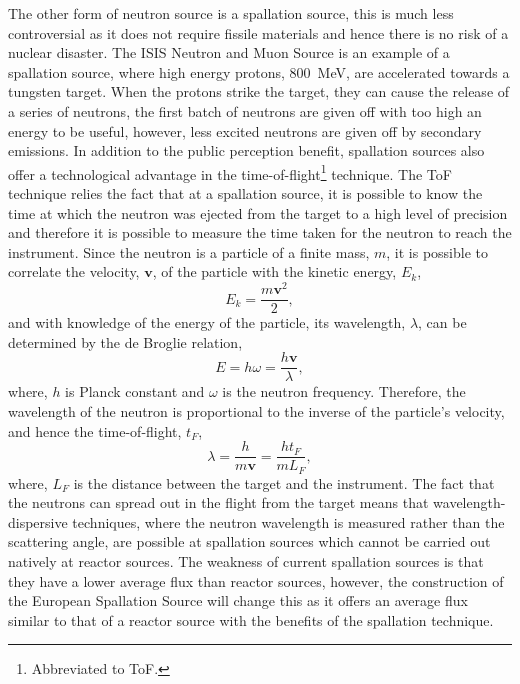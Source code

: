 The other form of neutron source is a spallation source, this is much less controversial as it does not require fissile materials and hence there is no risk of a nuclear disaster.
The ISIS Neutron and Muon Source is an example of a spallation source, where high energy protons, \SI{800}{\mega\eV},\autocite{noauthor_isis_nodate-1} are accelerated towards a tungsten target.
When the protons strike the target, they can cause the release of a series of neutrons, the first batch of neutrons are given off with too high an energy to be useful, however, less excited neutrons are given off by secondary emissions.
In addition to the public perception benefit, spallation sources also offer a technological advantage in the time-of-flight\footnote{Abbreviated to ToF.} technique.
The ToF technique relies the fact that at a spallation source, it is possible to know the time at which the neutron was ejected from the target to a high level of precision and therefore it is possible to measure the time taken for the neutron to reach the instrument.
Since the neutron is a particle of a finite mass, $m$, it is possible to correlate the velocity, $\mathbf{v}$, of the particle with the kinetic energy, $E_k$,
%
\begin{equation}
    E_k = \frac{m\mathbf{v}^2}{2},
\end{equation}
%
and with knowledge of the energy of the particle, its wavelength, $\lambda$, can be determined by the de Broglie relation,\autocite{de_broglie_recherches_1925}
%
\begin{equation}
    E = h\omega = \frac{h\mathbf{v}}{\lambda},
\end{equation}
%
where, $h$ is Planck constant and $\omega$ is the neutron frequency.
Therefore, the wavelength of the neutron is proportional to the inverse of the particle's velocity, and hence the time-of-flight, $t_F$,
%
\begin{equation}
    \lambda = \frac{h}{m\mathbf{v}} = \frac{ht_F}{mL_F},
\end{equation}
%
where, $L_F$ is the distance between the target and the instrument.
The fact that the neutrons can spread out in the flight from the target means that wavelength-dispersive techniques, where the neutron wavelength is measured rather than the scattering angle, are possible at spallation sources which cannot be carried out natively at reactor sources.
The weakness of current spallation sources is that they have a lower average flux than reactor sources, however, the construction of the European Spallation Source will change this as it offers an average flux similar to that of a reactor source with the benefits of the spallation technique.

